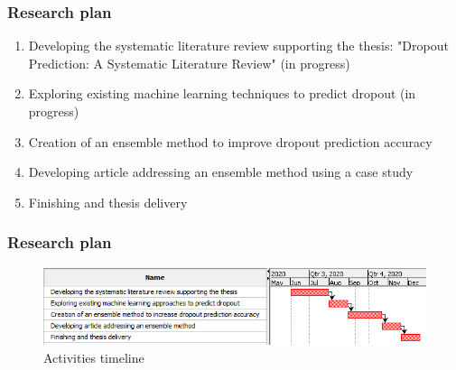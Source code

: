 \documentclass[10pt]{beamer}
\begin{document}

\begin{frame}
	\frametitle{Research plan}
	\begin{enumerate}
		\item Developing the systematic literature review supporting the thesis: "Dropout Prediction: A Systematic Literature Review" (in progress)
		\item Exploring existing machine learning techniques to predict dropout (in progress)
		\item Creation of an ensemble method to improve dropout prediction accuracy
		\item Developing article addressing an ensemble method using a case study
		\item Finishing and thesis delivery
	\end{enumerate}
\end{frame}

\begin{frame}
	\frametitle{Research plan}
	\begin{figure}
		\includegraphics[scale=0.5]{../img/chronogram.png}
		\caption{Activities timeline}
		\label{figure1}
	\end{figure}
\end{frame}
\end{document}
